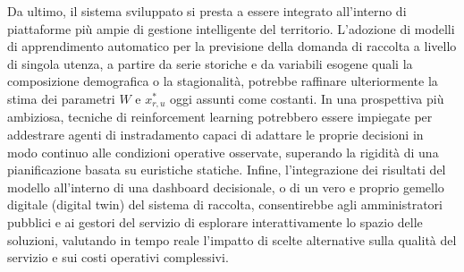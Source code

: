 Da ultimo, il sistema sviluppato si presta a essere integrato all'interno di piattaforme più ampie di gestione intelligente del territorio. L'adozione di modelli di apprendimento automatico per la previsione della domanda di raccolta a livello di singola utenza, a partire da serie storiche e da variabili esogene quali la composizione demografica o la stagionalità, potrebbe raffinare ulteriormente la stima dei parametri $W$ e $x^*_{r,u}$ oggi assunti come costanti. In una prospettiva più ambiziosa, tecniche di reinforcement learning potrebbero essere impiegate per addestrare agenti di instradamento capaci di adattare le proprie decisioni in modo continuo alle condizioni operative osservate, superando la rigidità di una pianificazione basata su euristiche statiche. Infine, l'integrazione dei risultati del modello all'interno di una dashboard decisionale, o di un vero e proprio gemello digitale (digital twin) del sistema di raccolta, consentirebbe agli amministratori pubblici e ai gestori del servizio di esplorare interattivamente lo spazio delle soluzioni, valutando in tempo reale l'impatto di scelte alternative sulla qualità del servizio e sui costi operativi complessivi.